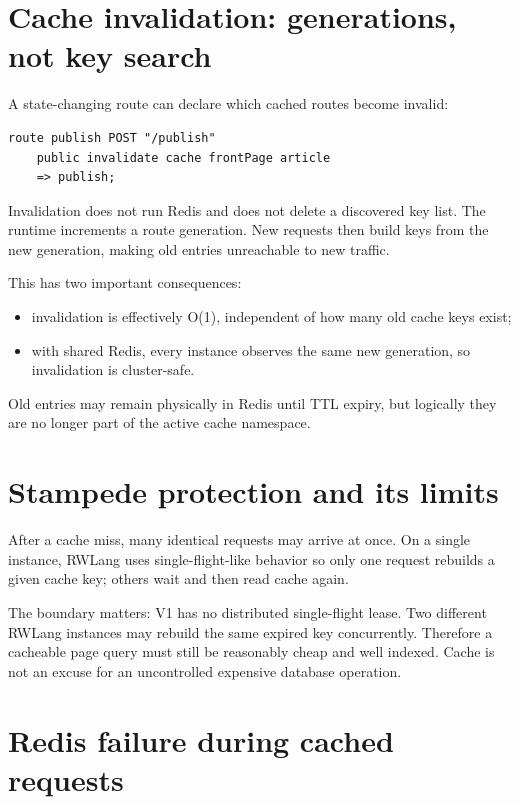 \section{Cache invalidation: generations, not key search}

A state-changing route can declare which cached routes become invalid:

\begin{lstlisting}[language=RWLang]
route publish POST "/publish"
    public invalidate cache frontPage article
    => publish;
\end{lstlisting}

Invalidation does not run Redis  and does not delete a discovered key list. The runtime increments a route generation. New requests then build keys from the new generation, making old entries unreachable to new traffic.

This has two important consequences:

\begin{itemize}
  \item invalidation is effectively O(1), independent of how many old cache keys exist;
  \item with shared Redis, every instance observes the same new generation, so invalidation is cluster-safe.
\end{itemize}

Old entries may remain physically in Redis until TTL expiry, but logically they are no longer part of the active cache namespace.

\section{Stampede protection and its limits}

After a cache miss, many identical requests may arrive at once. On a single instance, RWLang uses single-flight-like behavior so only one request rebuilds a given cache key; others wait and then read cache again.

The boundary matters: V1 has no distributed single-flight lease. Two different RWLang instances may rebuild the same expired key concurrently. Therefore a cacheable page query must still be reasonably cheap and well indexed. Cache is not an excuse for an uncontrolled expensive database operation.

\section{Redis failure during cached requests}

